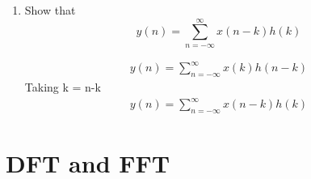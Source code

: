 \documentclass[journal,12pt,twocolumn]{IEEEtran}
\renewcommand\thesection{\arabic{section}}
\begin{document}
\begin{enumerate}[label=\thesection.\arabic*]
	\item Show that
	\begin{equation}
		y(n) =  \sum_{n=-\infty}^{\infty}x(n-k)h(k)
	\end{equation}
	
	\begin{align}
		y(n) = \sum_{n=-\infty}^{\infty}x(k)h(n-k)
	\end{align}
	Taking k = n-k
	\begin{align}
		y(n) =  \sum_{n=-\infty}^{\infty}x(n-k)h(k)
	\end{align}
\end{enumerate}

%
\section{DFT and FFT}
\end{document}
